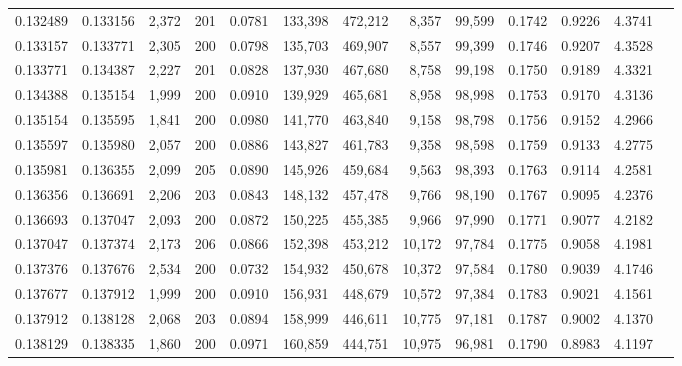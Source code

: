 \begin{tabular}{rrrrrrrrrrrrr}
0.132489 & 0.133156 & 2,372 & 201 &                                     0.0781 & 133,398 & 472,212 &   8,357 &  99,599 & 0.1742 & 0.9226 & 4.3741 \\
0.133157 & 0.133771 & 2,305 & 200 &                                     0.0798 & 135,703 & 469,907 &   8,557 &  99,399 & 0.1746 & 0.9207 & 4.3528 \\
0.133771 & 0.134387 & 2,227 & 201 &                                     0.0828 & 137,930 & 467,680 &   8,758 &  99,198 & 0.1750 & 0.9189 & 4.3321 \\
0.134388 & 0.135154 & 1,999 & 200 &                                     0.0910 & 139,929 & 465,681 &   8,958 &  98,998 & 0.1753 & 0.9170 & 4.3136 \\
0.135154 & 0.135595 & 1,841 & 200 &                                     0.0980 & 141,770 & 463,840 &   9,158 &  98,798 & 0.1756 & 0.9152 & 4.2966 \\
0.135597 & 0.135980 & 2,057 & 200 &                                     0.0886 & 143,827 & 461,783 &   9,358 &  98,598 & 0.1759 & 0.9133 & 4.2775 \\
0.135981 & 0.136355 & 2,099 & 205 &                                     0.0890 & 145,926 & 459,684 &   9,563 &  98,393 & 0.1763 & 0.9114 & 4.2581 \\
0.136356 & 0.136691 & 2,206 & 203 &                                     0.0843 & 148,132 & 457,478 &   9,766 &  98,190 & 0.1767 & 0.9095 & 4.2376 \\
0.136693 & 0.137047 & 2,093 & 200 &                                     0.0872 & 150,225 & 455,385 &   9,966 &  97,990 & 0.1771 & 0.9077 & 4.2182 \\
0.137047 & 0.137374 & 2,173 & 206 &                                     0.0866 & 152,398 & 453,212 &  10,172 &  97,784 & 0.1775 & 0.9058 & 4.1981 \\
0.137376 & 0.137676 & 2,534 & 200 &                                     0.0732 & 154,932 & 450,678 &  10,372 &  97,584 & 0.1780 & 0.9039 & 4.1746 \\
0.137677 & 0.137912 & 1,999 & 200 &                                     0.0910 & 156,931 & 448,679 &  10,572 &  97,384 & 0.1783 & 0.9021 & 4.1561 \\
0.137912 & 0.138128 & 2,068 & 203 &                                     0.0894 & 158,999 & 446,611 &  10,775 &  97,181 & 0.1787 & 0.9002 & 4.1370 \\
0.138129 & 0.138335 & 1,860 & 200 &                                     0.0971 & 160,859 & 444,751 &  10,975 &  96,981 & 0.1790 & 0.8983 & 4.1197 \\

\end{tabular}
